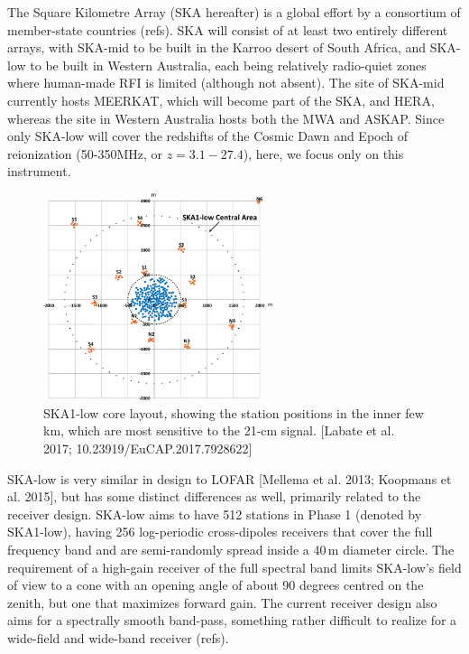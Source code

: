 The Square Kilometre Array (SKA hereafter) is a global effort by a consortium of member-state countries (refs). SKA will consist of at least two entirely different arrays, with SKA-mid to be built in the Karroo desert of South Africa, and SKA-low to be built in Western Australia, each being relatively radio-quiet zones where human-made RFI is limited (although not absent). The site of SKA-mid currently hosts MEERKAT, which will become part of the SKA, and HERA, whereas the site in Western Australia hosts both the MWA and ASKAP. Since only SKA-low will cover the redshifts of the Cosmic Dawn and Epoch of reionization (50-350MHz, or $z=3.1-27.4$), here, we focus only on this instrument. 
%
\begin{figure}[]
\begin{center}
\includegraphics[width=0.6\textwidth]{Koopmans_Bernardi/SKA-layout.png}
\end{center}
\caption{SKA1-low core layout, showing the station positions in the inner few km, which are most sensitive to the 21-cm signal. [Labate et al. 2017; 10.23919/EuCAP.2017.7928622]}
\label{fig:fig_ska_layout}
\end{figure}
%
SKA-low is very similar in design to LOFAR [Mellema et al. 2013; Koopmans et al. 2015], but has some distinct differences as well, primarily related to the receiver design. SKA-low aims to have 512 stations in Phase 1 (denoted by SKA1-low), having 256 log-periodic cross-dipoles receivers that cover the full frequency band and are semi-randomly spread inside a 40\,m diameter circle. The requirement of a high-gain receiver of the full spectral band limits SKA-low's field of view to a cone with an opening angle of about 90 degrees centred on the zenith, but one that maximizes forward gain. The current receiver design also aims for a spectrally smooth band-pass, something rather difficult to realize for a wide-field and wide-band receiver (refs).
